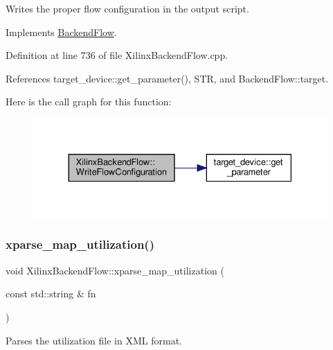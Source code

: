 Writes the proper flow configuration in the output script. 



Implements \hyperlink{classBackendFlow_acd93b1846b958eb6b7e10b9894bf5615}{Backend\+Flow}.



Definition at line 736 of file Xilinx\+Backend\+Flow.\+cpp.



References target\+\_\+device\+::get\+\_\+parameter(), S\+TR, and Backend\+Flow\+::target.

Here is the call graph for this function\+:
\nopagebreak
\begin{figure}[H]
\begin{center}
\leavevmode
\includegraphics[width=330pt]{d6/d94/classXilinxBackendFlow_a0c32028a834101dcd6b6e6df5481dbe4_cgraph}
\end{center}
\end{figure}
\mbox{\label{classXilinxBackendFlow_aee48e3dc259b3310102e708480a99410}} 
\subsubsection{\texorpdfstring{xparse\+\_\+map\+\_\+utilization()}{xparse\_map\_utilization()}}
{\footnotesize\ttfamily void Xilinx\+Backend\+Flow\+::xparse\+\_\+map\+\_\+utilization (\begin{DoxyParamCaption}\item[{const std\+::string \&}]{fn }\end{DoxyParamCaption})\hspace{0.3cm}{\ttfamily [protected]}}



Parses the utilization file in X\+ML format. 



